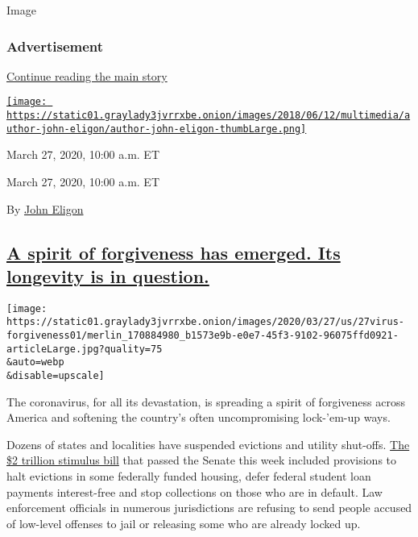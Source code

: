 Image

\hypertarget{advertisement-4}{%
\subsubsection{Advertisement}\label{advertisement-4}}

\protect\hyperlink{after-dfp-ad-mid5}{Continue reading the main story}

\href{https://www.nytimes3xbfgragh.onion/by/john-eligon}{\texttt{[image: https://static01.graylady3jvrrxbe.onion/images/2018/06/12/multimedia/author-john-eligon/author-john-eligon-thumbLarge.png]}}

March 27, 2020, 10:00 a.m. ET

March 27, 2020, 10:00 a.m. ET

By \href{https://www.nytimes3xbfgragh.onion/by/john-eligon}{John Eligon}

\hypertarget{a-spirit-of-forgiveness-has-emerged-its-longevity-is-in-question}{%
\subsection{\texorpdfstring{\protect\hyperlink{a-spirit-of-forgiveness-has-emerged-its-longevity-is-in-question}{A
spirit of forgiveness has emerged. Its longevity is in
question.}}{A spirit of forgiveness has emerged. Its longevity is in question.}}\label{a-spirit-of-forgiveness-has-emerged-its-longevity-is-in-question}}

\texttt{[image: https://static01.graylady3jvrrxbe.onion/images/2020/03/27/us/27virus-forgiveness01/merlin\_170884980\_b1573e9b-e0e7-45f3-9102-96075ffd0921-articleLarge.jpg?quality=75\\\&auto=webp\\\&disable=upscale]}

The coronavirus, for all its devastation, is spreading a spirit of
forgiveness across America and softening the country's often
uncompromising lock-'em-up ways.

Dozens of states and localities have suspended evictions and utility
shut-offs.
\href{https://www.nytimes3xbfgragh.onion/2020/03/25/us/politics/coronavirus-senate-deal.html}{The
\$2 trillion stimulus bill} that passed the Senate this week included
provisions to halt evictions in some federally funded housing, defer
federal student loan payments interest-free and stop collections on
those who are in default. Law enforcement officials in numerous
jurisdictions are refusing to send people accused of low-level offenses
to jail or releasing some who are already locked up.

